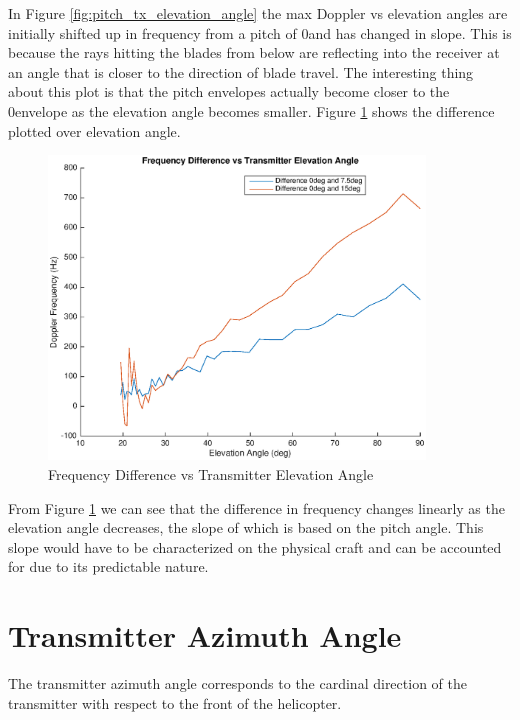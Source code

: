 In Figure \ref{fig:pitch_tx_elevation_angle} the max Doppler vs elevation angles are initially shifted up in frequency from a pitch of 0\textdegree \space and has changed in slope. This is because the rays hitting the blades from below are reflecting into the receiver at an angle that is closer to the direction of blade travel. The interesting thing about this plot is that the pitch envelopes actually become closer to the 0\textdegree \space envelope as the elevation angle becomes smaller. Figure \ref{fig:pitch_tx_elevation_angle_difference} shows the difference plotted over elevation angle.

\begin{figure}
	\begin{center}
		\includegraphics[width=10cm]{images/simulation/elevation_angle_with_pitch_max_doppler_Difference.eps}
		\caption{Frequency Difference vs Transmitter Elevation Angle}
		\label{fig:pitch_tx_elevation_angle_difference}
	\end{center}
\end{figure}

From Figure \ref{fig:pitch_tx_elevation_angle_difference} we can see that the difference in frequency changes linearly as the elevation angle decreases, the slope of which is based on the pitch angle. This slope would have to be characterized on the physical craft and can be accounted for due to its predictable nature.

\section{Transmitter Azimuth Angle} \label{taa}
The transmitter azimuth angle corresponds to the cardinal direction of the transmitter with respect to the front of the helicopter.

